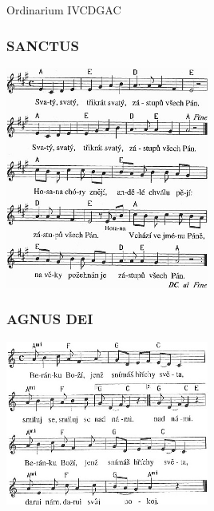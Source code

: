\begin{song}{Ordinarium IV}{CDGAC}{}
\subsubsection*{SANCTUS}
\includegraphics[width=0.5\textwidth]{noty/c_o4-sanctus}
\subsubsection*{AGNUS DEI}
\includegraphics[width=0.5\textwidth]{noty/c_o4-agnus-dei} 

\end{song}
\pagebreak
